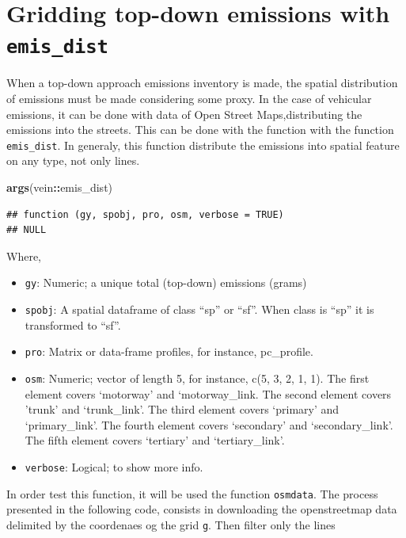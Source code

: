 \documentclass[12pt,graybox,envcountchap,sectrefs]{krantz}
\makeatletter
\newenvironment{Shaded}{\begin{snugshade}}{\end{snugshade}}
\newcommand{\KeywordTok}[1]{\textcolor[rgb]{0.13,0.29,0.53}{\textbf{#1}}}
\newcommand{\OperatorTok}[1]{\textcolor[rgb]{0.81,0.36,0.00}{\textbf{#1}}}
\newcommand{\NormalTok}[1]{#1}
\providecommand{\tightlist}{%
  \setlength{\itemsep}{0pt}\setlength{\parskip}{0pt}}
\newenvironment{kframe}{%
\medskip{}
\setlength{\fboxsep}{.8em}
 \def\at@end@of@kframe{}%
 \ifinner\ifhmode%
  \def\at@end@of@kframe{\end{minipage}}%
  \begin{minipage}{\columnwidth}%
 \fi\fi%
 \def\FrameCommand##1{\hskip\@totalleftmargin \hskip-\fboxsep
 \colorbox{shadecolor}{##1}\hskip-\fboxsep
     \hskip-\linewidth \hskip-\@totalleftmargin \hskip\columnwidth}%
 \MakeFramed {\advance\hsize-\width
   \@totalleftmargin\z@ \linewidth\hsize
   \@setminipage}}%
 {\par\unskip\endMakeFramed%
 \at@end@of@kframe}
\renewenvironment{Shaded}{\begin{kframe}}{\end{kframe}}
\theoremstyle{definition}
\theoremstyle{definition}
\theoremstyle{definition}
\theoremstyle{remark}
\makeatother
\begin{document}
\section{\texorpdfstring{Gridding top-down emissions with
\texttt{emis\_dist}}{Gridding top-down emissions with emis\_dist}}\label{gridding-top-down-emissions-with-emis_dist}

When a top-down approach emissions inventory is made, the spatial
distribution of emissions must be made considering some proxy. In the
case of vehicular emissions, it can be done with data of Open Street
Maps,distributing the emissions into the streets. This can be done with
the function with the function \texttt{emis\_dist}. In generaly, this
function distribute the emissions into spatial feature on any type, not
only lines.

\begin{Shaded}
\begin{Highlighting}[]
\KeywordTok{args}\NormalTok{(vein}\OperatorTok{::}\NormalTok{emis_dist)}
\end{Highlighting}
\end{Shaded}

\begin{verbatim}
## function (gy, spobj, pro, osm, verbose = TRUE) 
## NULL
\end{verbatim}

Where,

\begin{itemize}
\tightlist
\item
  \texttt{gy}: Numeric; a unique total (top-down) emissions (grams)
\item
  \texttt{spobj}: A spatial dataframe of class ``sp'' or ``sf''. When
  class is ``sp'' it is transformed to ``sf''.
\item
  \texttt{pro}: Matrix or data-frame profiles, for instance,
  pc\_profile.
\item
  \texttt{osm}: Numeric; vector of length 5, for instance, c(5, 3, 2, 1,
  1). The first element covers `motorway' and `motorway\_link. The
  second element covers 'trunk' and `trunk\_link'. The third element
  covers `primary' and `primary\_link'. The fourth element covers
  `secondary' and `secondary\_link'. The fifth element covers `tertiary'
  and `tertiary\_link'.
\item
  \texttt{verbose}: Logical; to show more info.
\end{itemize}

In order test this function, it will be used the function
\texttt{osmdata}. The process presented in the following code, consists
in downloading the openstreetmap data delimited by the coordenaes og the
grid \texttt{g}. Then filter only the lines
\end{document}
